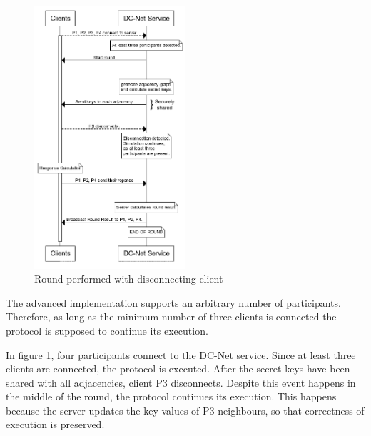 \begin{figure}[H]
    \centering
    \includegraphics[width=0.5\textwidth]{Images/Design/roundWithDisconnections.png}
    \caption{Round performed with disconnecting client}
    \label{fig:roundWithDisconnections}
\end{figure}

The advanced implementation supports an arbitrary number of participants. Therefore, as long as the minimum number of three clients is connected the protocol is supposed to continue its execution. 

In figure \ref{fig:roundWithDisconnections}, four participants connect to the DC-Net service. Since at least three clients are connected, the protocol is executed. After the secret keys have been shared with all adjacencies, client P3 disconnects. Despite this event happens in the middle of the round, the protocol continues its execution. This happens because the server updates the key values of P3 neighbours, so that correctness of execution is preserved.

